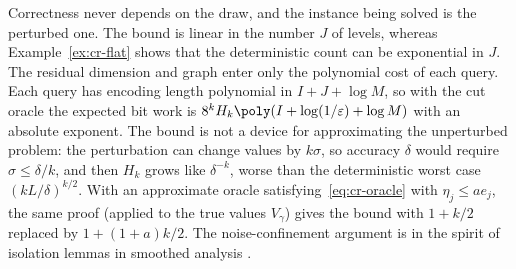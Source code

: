 \begin{remark}\label{rem:cr-smoothed}
Correctness never depends on the draw, and the instance being solved is
the perturbed one. The bound is linear in the number $J$ of levels,
whereas Example~\ref{ex:cr-flat} shows that the deterministic count can be
exponential in $J$. The residual dimension and graph enter only the
polynomial cost of each query. Each query has encoding length polynomial
in $I+J+\log M$, so with the cut oracle the expected bit work is
$8^kH_k\poly(I+\log(1/\varepsilon)+\log M)$ with an absolute exponent.
The bound is not a device for approximating the unperturbed problem: the
perturbation can change values by $k\sigma$, so accuracy $\delta$ would
require $\sigma\le\delta/k$, and then $H_k$ grows like $\delta^{-k}$,
worse than the deterministic worst case $(kL/\delta)^{k/2}$. With an
approximate oracle satisfying~\eqref{eq:cr-oracle} with $\eta_j\le ae_j$,
the same proof (applied to the true values $V_\gamma$) gives the bound
with $1+k/2$ replaced by $1+(1+a)k/2$. The noise-confinement argument is
in the spirit of isolation lemmas in smoothed analysis
\cite{BeierVocking2004,RoglinVocking2007}.
\end{remark}

